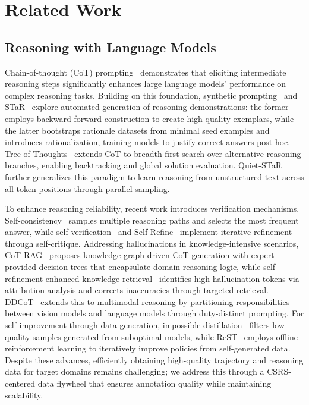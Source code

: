
\section{Related Work}
\subsection{Reasoning with Language Models}

Chain-of-thought (CoT) prompting~\cite{wei2022chain_cot} demonstrates that eliciting intermediate reasoning steps significantly enhances large language models' performance on complex reasoning tasks. Building on this foundation, synthetic prompting~\cite{shao2023synthetic_synprompt} and STaR~\cite{zelikman2022star} explore automated generation of reasoning demonstrations: the former employs backward-forward construction to create high-quality exemplars, while the latter bootstraps rationale datasets from minimal seed examples and introduces rationalization, training models to justify correct answers post-hoc. Tree of Thoughts~\cite{yao2023tree_tot} extends CoT to breadth-first search over alternative reasoning branches, enabling backtracking and global solution evaluation. Quiet-STaR~\cite{zelikman2024quiet_quietstar} further generalizes this paradigm to learn reasoning from unstructured text across all token positions through parallel sampling.

To enhance reasoning reliability, recent work introduces verification mechanisms. Self-consistency~\cite{wang2022self_consistency} samples multiple reasoning paths and selects the most frequent answer, while self-verification~\cite{weng2023large_self_verification} and Self-Refine~\cite{madaan2023self_selfrefine} implement iterative refinement through self-critique. Addressing hallucinations in knowledge-intensive scenarios, CoT-RAG~\cite{li2025cot_rag} proposes knowledge graph-driven CoT generation with expert-provided decision trees that encapsulate domain reasoning logic, while self-refinement-enhanced knowledge retrieval~\cite{niu2024mitigating} identifies high-hallucination tokens via attribution analysis and corrects inaccuracies through targeted retrieval. DDCoT~\cite{zheng2023ddcot} extends this to multimodal reasoning by partitioning responsibilities between vision models and language models through duty-distinct prompting.
For self-improvement through data generation, impossible distillation~\cite{jung2023impossibledistill} filters low-quality samples generated from suboptimal models, while ReST~\cite{gulcehre2023reinforced_rest} employs offline reinforcement learning to iteratively improve policies from self-generated data. Despite these advances, efficiently obtaining high-quality trajectory and reasoning data for target domains remains challenging; we address this through a CSRS-centered data flywheel that ensures annotation quality while maintaining scalability. 

